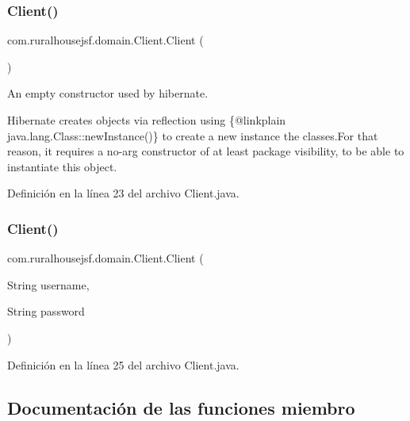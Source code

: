 \subsubsection{\texorpdfstring{Client()}{Client()}\hspace{0.1cm}{\footnotesize\ttfamily [1/2]}}
{\footnotesize\ttfamily com.\+ruralhousejsf.\+domain.\+Client.\+Client (\begin{DoxyParamCaption}{ }\end{DoxyParamCaption})\hspace{0.3cm}{\ttfamily [package]}}

An empty constructor used by hibernate. 

Hibernate creates objects via reflection using \{@linkplain java.\+lang.\+Class\+::new\+Instance()\} to create a new instance the classes.\+For that reason, it requires a no-\/arg constructor of at least package visibility, to be able to instantiate this object. 

Definición en la línea 23 del archivo Client.\+java.

\mbox{\label{classcom_1_1ruralhousejsf_1_1domain_1_1_client_a57bf8892cfbb684bcda11d6bb786871b}} 
\subsubsection{\texorpdfstring{Client()}{Client()}\hspace{0.1cm}{\footnotesize\ttfamily [2/2]}}
{\footnotesize\ttfamily com.\+ruralhousejsf.\+domain.\+Client.\+Client (\begin{DoxyParamCaption}\item[{String}]{username,  }\item[{String}]{password }\end{DoxyParamCaption})}



Definición en la línea 25 del archivo Client.\+java.



\subsection{Documentación de las funciones miembro}
\mbox{\label{classcom_1_1ruralhousejsf_1_1domain_1_1_client_acf199d84c39f08cea14078ef175be9f5}} 
